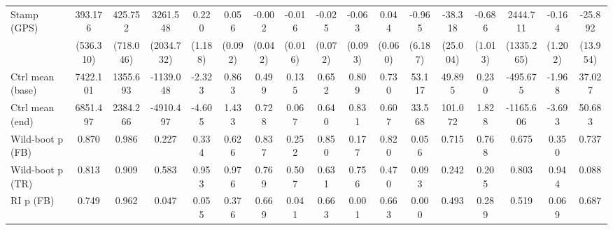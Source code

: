 {\begin{tabular}{l*{16}{c}}
Stamp (GPS)         &     393.176         &     425.752         &    3261.548         &       0.220         &       0.056         &      -0.002         &      -0.016         &      -0.025         &      -0.063         &       0.044         &      -0.965         &     -38.318         &      -0.686         &    2444.711         &      -0.164         &     -25.892         \\
                    &   (536.310)         &   (718.046)         &  (2034.732)         &     (1.188)         &     (0.092)         &     (0.042)         &     (0.016)         &     (0.072)         &     (0.093)         &     (0.060)         &     (6.187)         &    (25.004)         &     (1.013)         &  (1335.265)         &     (1.202)         &    (13.954)         \\
\midrule
Ctrl mean (base)    &    7422.101         &    1355.693         &   -1139.048         &      -2.323         &       0.863         &       0.499         &       0.135         &       0.652         &       0.809         &       0.730         &      53.117         &      49.895         &       0.230         &    -495.675         &      -1.968         &      37.027         \\
Ctrl mean (end)     &    6851.497         &    2384.266         &   -4910.497         &      -4.605         &       1.433         &       0.728         &       0.067         &       0.640         &       0.831         &       0.607         &      33.568         &     101.072         &       1.828         &   -1165.606         &      -3.693         &      50.683         \\
Wild-boot p (FB)    &       0.870         &       0.986         &       0.227         &       0.334         &       0.626         &       0.837         &       0.252         &       0.850         &       0.177         &       0.820         &       0.056         &       0.715         &       0.768         &       0.675         &       0.350         &       0.737         \\
Wild-boot p (TR)    &       0.813         &       0.909         &       0.583         &       0.953         &       0.976         &       0.769         &       0.507         &       0.631         &       0.756         &       0.470         &       0.093         &       0.242         &       0.205         &       0.803         &       0.944         &       0.088         \\
RI p (FB)           &       0.749         &       0.962         &       0.047         &       0.055         &       0.376         &       0.669         &       0.041         &       0.663         &       0.001         &       0.663         &       0.000         &       0.493         &       0.289         &       0.519         &       0.069         &       0.687         \\

\end{tabular}}
